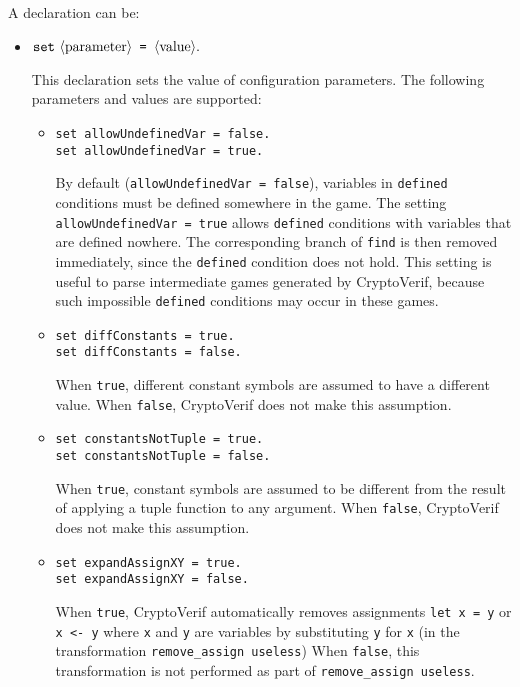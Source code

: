 A declaration can be:
\begin{itemize}

\item ${\tt set\ } \langle\textrm{parameter}\rangle \texttt{ = } \langle\textrm{value}\rangle{\tt .}$

This declaration sets the value of configuration parameters.
The following parameters and values are supported:

\begin{itemize}

\item \texttt{set allowUndefinedVar = false.}\\
\texttt{set allowUndefinedVar = true.}

By default (\texttt{allowUndefinedVar = false}), variables in
\texttt{defined} conditions must be defined somewhere in the game.
The setting \texttt{allowUndefinedVar = true} allows
\texttt{defined} conditions with variables that are defined
nowhere. The corresponding branch of \texttt{find} is then
removed immediately, since the \texttt{defined} condition does not hold.
This setting is useful to parse intermediate games generated by
CryptoVerif, because such impossible \texttt{defined} conditions
may occur in these games.

\item \texttt{set diffConstants = true.}\\
\texttt{set diffConstants = false.}

When {\tt true}, different constant symbols are assumed to have a
different value. When {\tt false}, CryptoVerif does not make this
assumption.

\item \texttt{set constantsNotTuple = true.}\\
\texttt{set constantsNotTuple = false.}

When {\tt true}, constant symbols are assumed to be different from the
result of applying a tuple function to any argument. When {\tt false},
CryptoVerif does not make this assumption.

\item \texttt{set expandAssignXY = true.}\\
\texttt{set expandAssignXY = false.}

When {\tt true}, CryptoVerif automatically removes assignments 
{\tt let x = y} or {\tt x <- y}
where {\tt x} and {\tt y} are variables by substituting {\tt y} for {\tt x}
(in the transformation {\tt remove\string_assign useless})
When {\tt false}, this transformation is not performed as part of
{\tt remove\string_assign useless}.


\end{itemize}
\end{itemize}

